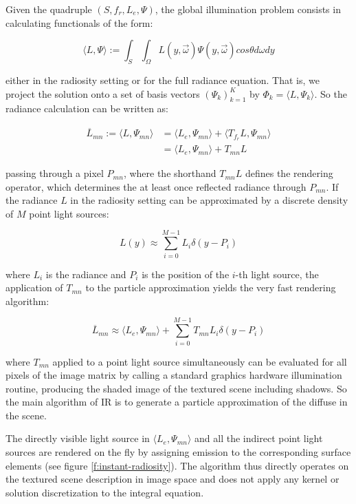 Given the quadruple $(S,f_r,L_e,\Psi)$, the global illumination problem consists in calculating functionals of the form:

\begin{equation*}
	\langle L,\Psi\rangle :=\int_S\int_\Omega L(y,\vec{\omega})\Psi(y,\vec{\omega})cos\theta d\omega dy
\end{equation*}

either in the radiosity setting or for the full radiance equation. That is, we project the solution onto a set of basis vectors $(\Psi_k)^{K}_{k=1}$ by $\Phi_k=\langle L,\Psi_k\rangle$. So the radiance calculation can be written as:

\begin{equation}
\begin{aligned}
	\overline{L}_{mn}:=\langle L,\Psi_{mn}\rangle &=\langle L_e,\Psi_{mn}\rangle+\langle T_{f_r}L,\Psi_{mn} \rangle \\
	&=\langle L_e,\Psi_{mn} \rangle+T_{mn}L
\end{aligned}
\end{equation}

passing through a pixel $P_{mn}$, where the shorthand $T_{mn}L$ defines the rendering operator, which determines the at least once reflected radiance through $P_{mn}$. If the radiance $L$ in the radiosity setting can be approximated by a discrete density of $M$ point light sources:

\begin{equation}\label{e:m-point-light-approximation}
	L(y)\approx\sum^{M-1}_{i=0}L_i\delta(y-P_i)
\end{equation}

where $L_i$ is the radiance and $P_i$ is the position of the $i$-th light source, the application of $T_{mn}$ to the particle approximation yields the very fast rendering algorithm:

\begin{equation*}
	\overline{L}_{mn}\approx \langle L_e,\Psi_{mn}\rangle+\sum^{M-1}_{i=0}T_{mn}L_i\delta(y-P_i)
\end{equation*}

where $T_{mn}$ applied to a point light source simultaneously can be evaluated for all pixels of the image matrix by calling a standard graphics hardware illumination routine, producing the shaded image of the textured scene including shadows. So the main algorithm of IR is to generate a particle approximation of the diffuse in the scene.

The directly visible light source in $\langle L_e,\Psi_{mn}\rangle$ and all the indirect point light sources are rendered on the fly by assigning emission to the corresponding surface elements (see figure \ref{f:instant-radiosity}). The algorithm thus directly operates on the textured scene description in image space and does not apply any kernel or solution discretization to the integral equation.

